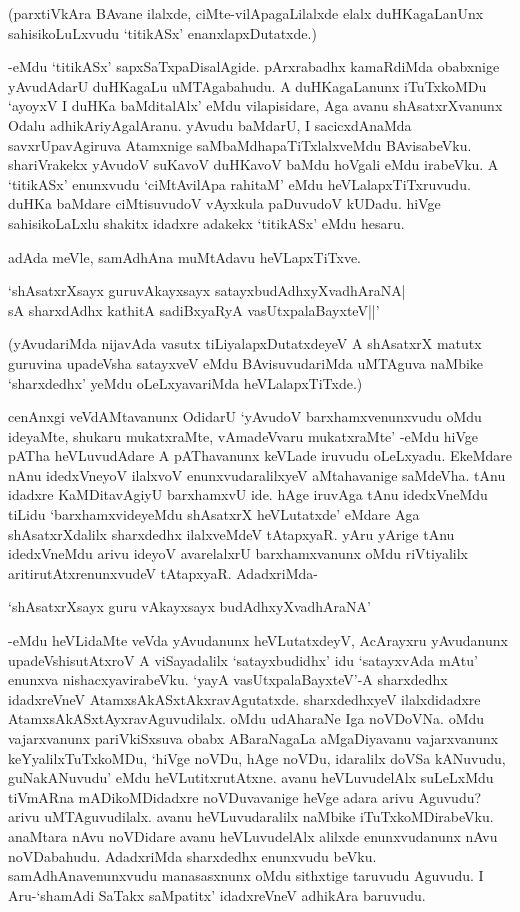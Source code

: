 (parxtiVkAra BAvane ilalxde, ciMte-vilApagaLilalxde elalx duHKagaLanUnx sahisikoLuLxvudu `titikASx' enanxlapxDutatxde.)

-eMdu `titikASx' sapxSaTxpaDisalAgide. pArxrabadhx kamaRdiMda obabxnige yAvudAdarU duHKagaLu uMTAgabahudu. A duHKagaLanunx iTuTxkoMDu `ayoyxV I duHKa baMditalAlx' eMdu vilapisidare, Aga avanu shAsatxrXvanunx Odalu adhikAriyAgalAranu. yAvudu baMdarU, I sacicxdAnaMda savxrUpavAgiruva Atamxnige saMbaMdhapaTiTxlalxveMdu BAvisabeVku. shariVrakekx yAvudoV suKavoV duHKavoV baMdu hoVgali eMdu irabeVku. A `titikASx' enunxvudu `ciMtAvilApa rahitaM' eMdu heVLalapxTiTxruvudu. duHKa baMdare ciMtisuvudoV vAyxkula paDuvudoV kUDadu. hiVge sahisikoLaLxlu shakitx idadxre adakekx `titikASx' eMdu hesaru.

adAda meVle, samAdhAna muMtAdavu heVLapxTiTxve.

\begin{shloka}
`shAsatxrXsayx guruvAkayxsayx satayxbudAdhxyXvadhAraNA|\\
sA sharxdAdhx kathitA sadiBxyaRyA vasUtxpalaBayxteV||'
\end{shloka}

(yAvudariMda nijavAda vasutx tiLiyalapxDutatxdeyeV A shAsatxrX matutx guruvina upadeVsha satayxveV eMdu BAvisuvudariMda uMTAguva naMbike `sharxdedhx' yeMdu oLeLxyavariMda heVLalapxTiTxde.)

cenAnxgi veVdAMtavanunx OdidarU `yAvudoV barxhamxvenunxvudu oMdu ideyaMte, shukaru mukatxraMte, vAmadeVvaru mukatxraMte' -eMdu hiVge pATha heVLuvudAdare A pAThavanunx keVLade iruvudu oLeLxyadu. EkeMdare nAnu idedxVneyoV ilalxvoV enunxvudaralilxyeV aMtahavanige saMdeVha. tAnu idadxre KaMDitavAgiyU barxhamxvU ide. hAge iruvAga tAnu idedxVneMdu tiLidu `barxhamxvideyeMdu shAsatxrX heVLutatxde' eMdare Aga shAsatxrXdalilx sharxdedhx ilalxveMdeV tAtapxyaR. yAru yArige tAnu idedxVneMdu arivu ideyoV avarelalxrU barxhamxvanunx oMdu riVtiyalilx aritirutAtxrenunxvudeV tAtapxyaR. AdadxriMda-

\begin{shloka}
`shAsatxrXsayx guru vAkayxsayx budAdhxyXvadhAraNA'
\end{shloka}

-eMdu heVLidaMte veVda yAvudanunx heVLutatxdeyV, AcArayxru yAvudanunx upadeVshisutAtxroV A viSayadalilx `satayxbudidhx' idu `satayxvAda mAtu' enunxva nishacxyavirabeVku. `yayA vasUtxpalaBayxteV'-A sharxdedhx idadxreVneV AtamxsAkASxtAkxravAgutatxde. sharxdedhxyeV ilalxdidadxre AtamxsAkASxtAyxravAguvudilalx. oMdu udAharaNe Iga noVDoVNa. oMdu vajarxvanunx pariVkiSxsuva obabx ABaraNagaLa aMgaDiyavanu vajarxvanunx keYyalilxTuTxkoMDu, `hiVge noVDu, hAge noVDu, idaralilx doVSa kANuvudu, guNakANuvudu' eMdu heVLutitxrutAtxne. avanu heVLuvudelAlx suLeLxMdu tiVmARna mADikoMDidadxre noVDuvavanige heVge adara arivu Aguvudu? arivu uMTAguvudilalx. avanu heVLuvudaralilx naMbike iTuTxkoMDirabeVku. anaMtara nAvu noVDidare avanu heVLuvudelAlx alilxde enunxvudanunx nAvu noVDabahudu. AdadxriMda sharxdedhx enunxvudu beVku. samAdhAnavenunxvudu manasasxnunx oMdu sithxtige taruvudu Aguvudu. I Aru-`shamAdi SaTakx saMpatitx' idadxreVneV adhikAra baruvudu.

